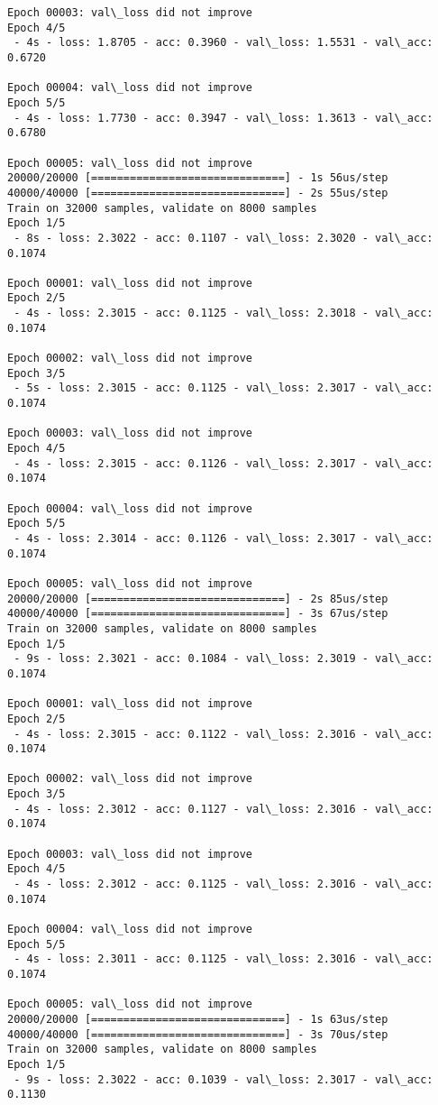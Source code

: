 \documentclass[11pt]{article}
\begin{document}
\begin{Verbatim}[commandchars=\\\{\}]
Epoch 00003: val\_loss did not improve
Epoch 4/5
 - 4s - loss: 1.8705 - acc: 0.3960 - val\_loss: 1.5531 - val\_acc: 0.6720

Epoch 00004: val\_loss did not improve
Epoch 5/5
 - 4s - loss: 1.7730 - acc: 0.3947 - val\_loss: 1.3613 - val\_acc: 0.6780

Epoch 00005: val\_loss did not improve
20000/20000 [==============================] - 1s 56us/step
40000/40000 [==============================] - 2s 55us/step
Train on 32000 samples, validate on 8000 samples
Epoch 1/5
 - 8s - loss: 2.3022 - acc: 0.1107 - val\_loss: 2.3020 - val\_acc: 0.1074

Epoch 00001: val\_loss did not improve
Epoch 2/5
 - 4s - loss: 2.3015 - acc: 0.1125 - val\_loss: 2.3018 - val\_acc: 0.1074

Epoch 00002: val\_loss did not improve
Epoch 3/5
 - 5s - loss: 2.3015 - acc: 0.1125 - val\_loss: 2.3017 - val\_acc: 0.1074

Epoch 00003: val\_loss did not improve
Epoch 4/5
 - 4s - loss: 2.3015 - acc: 0.1126 - val\_loss: 2.3017 - val\_acc: 0.1074

Epoch 00004: val\_loss did not improve
Epoch 5/5
 - 4s - loss: 2.3014 - acc: 0.1126 - val\_loss: 2.3017 - val\_acc: 0.1074

Epoch 00005: val\_loss did not improve
20000/20000 [==============================] - 2s 85us/step
40000/40000 [==============================] - 3s 67us/step
Train on 32000 samples, validate on 8000 samples
Epoch 1/5
 - 9s - loss: 2.3021 - acc: 0.1084 - val\_loss: 2.3019 - val\_acc: 0.1074

Epoch 00001: val\_loss did not improve
Epoch 2/5
 - 4s - loss: 2.3015 - acc: 0.1122 - val\_loss: 2.3016 - val\_acc: 0.1074

Epoch 00002: val\_loss did not improve
Epoch 3/5
 - 4s - loss: 2.3012 - acc: 0.1127 - val\_loss: 2.3016 - val\_acc: 0.1074

Epoch 00003: val\_loss did not improve
Epoch 4/5
 - 4s - loss: 2.3012 - acc: 0.1125 - val\_loss: 2.3016 - val\_acc: 0.1074

Epoch 00004: val\_loss did not improve
Epoch 5/5
 - 4s - loss: 2.3011 - acc: 0.1125 - val\_loss: 2.3016 - val\_acc: 0.1074

Epoch 00005: val\_loss did not improve
20000/20000 [==============================] - 1s 63us/step
40000/40000 [==============================] - 3s 70us/step
Train on 32000 samples, validate on 8000 samples
Epoch 1/5
 - 9s - loss: 2.3022 - acc: 0.1039 - val\_loss: 2.3017 - val\_acc: 0.1130


\end{Verbatim}
\end{document}

